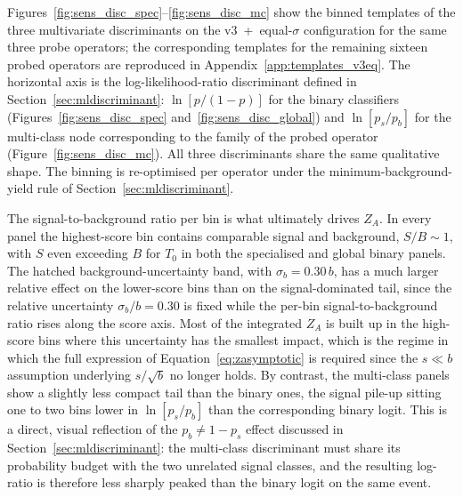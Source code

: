 Figures~\ref{fig:sens_disc_spec}--\ref{fig:sens_disc_mc} show the binned templates of the three multivariate discriminants on the v3~+~equal-$\sigma$ configuration for the same three probe operators; the corresponding templates for the remaining sixteen probed operators are reproduced in Appendix~\ref{app:templates_v3eq}. The horizontal axis is the log-likelihood-ratio discriminant defined in Section~\ref{sec:mldiscriminant}: $\ln[p/(1-p)]$ for the binary classifiers (Figures~\ref{fig:sens_disc_spec} and~\ref{fig:sens_disc_global}) and $\ln[p_s/p_b]$ for the multi-class node corresponding to the family of the probed operator (Figure~\ref{fig:sens_disc_mc}). All three discriminants share the same qualitative shape. The binning is re-optimised per operator under the minimum-background-yield rule of Section~\ref{sec:mldiscriminant}. 

The signal-to-background ratio per bin is what ultimately drives $Z_A$. In every panel the highest-score bin contains comparable signal and background, $S/B\sim 1$, with $S$ even exceeding $B$ for $T_0$ in both the specialised and global binary panels. The hatched background-uncertainty band, with $\sigma_b=0.30\,b$, has a much larger relative effect on the lower-score bins than on the signal-dominated tail, since the relative uncertainty $\sigma_b/b=0.30$ is fixed while the per-bin signal-to-background ratio rises along the score axis. Most of the integrated $Z_A$ is built up in the high-score bins where this uncertainty has the smallest impact, which is the regime in which the full expression of Equation~\ref{eq:zasymptotic} is required since the $s\ll b$ assumption underlying $s/\sqrt{b}$ no longer holds. By contrast, the multi-class panels show a slightly less compact tail than the binary ones, the signal pile-up sitting one to two bins lower in $\ln[p_s/p_b]$ than the corresponding binary logit. This is a direct, visual reflection of the $p_b\neq 1-p_s$ effect discussed in Section~\ref{sec:mldiscriminant}: the multi-class discriminant must share its probability budget with the two unrelated signal classes, and the resulting log-ratio is therefore less sharply peaked than the binary logit on the same event.

